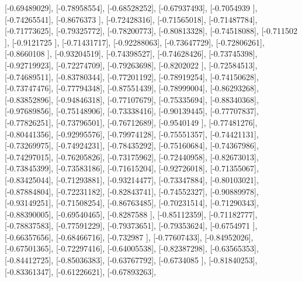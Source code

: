 \documentclass{article}
\begin{document}
       [-0.69489029],
       [-0.78958554],
       [-0.68528252],
       [-0.67937493],
       [-0.7054939 ],
       [-0.74265541],
       [-0.8676373 ],
       [-0.72428316],
       [-0.71565018],
       [-0.71487784],
       [-0.71773625],
       [-0.79325772],
       [-0.78200773],
       [-0.80813328],
       [-0.74518088],
       [-0.711502  ],
       [-0.9121725 ],
       [-0.71431717],
       [-0.92288063],
       [-0.73647729],
       [-0.72806261],
       [-0.8660108 ],
       [-0.93204519],
       [-0.74398527],
       [-0.74628426],
       [-0.73745398],
       [-0.92719923],
       [-0.72274709],
       [-0.79263698],
       [-0.8202022 ],
       [-0.72584513],
       [-0.74689511],
       [-0.83780344],
       [-0.77201192],
       [-0.78919254],
       [-0.74150628],
       [-0.73747476],
       [-0.77794348],
       [-0.87551439],
       [-0.78999004],
       [-0.86293268],
       [-0.83852896],
       [-0.94846318],
       [-0.77107679],
       [-0.75335694],
       [-0.88340368],
       [-0.97689856],
       [-0.75148906],
       [-0.73338416],
       [-0.90139445],
       [-0.77707837],
       [-0.77826251],
       [-0.73796501],
       [-0.76712689],
       [-0.9540149 ],
       [-0.77481276],
       [-0.80441356],
       [-0.92995576],
       [-0.79974128],
       [-0.75551357],
       [-0.74421131],
       [-0.73269975],
       [-0.74924231],
       [-0.78435292],
       [-0.75160684],
       [-0.74367986],
       [-0.74297015],
       [-0.76205826],
       [-0.73175962],
       [-0.72440958],
       [-0.82673013],
       [-0.73845399],
       [-0.73583186],
       [-0.71615204],
       [-0.92726018],
       [-0.71355067],
       [-0.83425044],
       [-0.71293881],
       [-0.93214477],
       [-0.73347884],
       [-0.80103021],
       [-0.87884804],
       [-0.72231182],
       [-0.82843741],
       [-0.74552327],
       [-0.90889978],
       [-0.93149251],
       [-0.71508254],
       [-0.86763485],
       [-0.70231514],
       [-0.71290343],
       [-0.88390005],
       [-0.69540465],
       [-0.8287588 ],
       [-0.85112359],
       [-0.71182777],
       [-0.78837583],
       [-0.77591229],
       [-0.79373651],
       [-0.79353624],
       [-0.6754971 ],
       [-0.66357656],
       [-0.68466716],
       [-0.732987  ],
       [-0.77607433],
       [-0.84952026],
       [-0.67501365],
       [-0.72297416],
       [-0.64005538],
       [-0.82387298],
       [-0.63565353],
       [-0.84412725],
       [-0.85036383],
       [-0.63767792],
       [-0.6734085 ],
       [-0.81840253],
       [-0.83361347],
       [-0.61226621],
       [-0.67893263],
\end{document}
